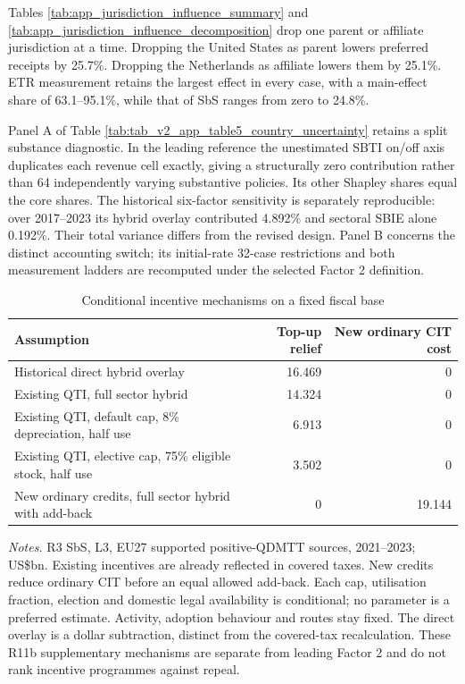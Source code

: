 \documentclass[11pt,a4paper]{article}
\begin{document}



Tables \ref{tab:app_jurisdiction_influence_summary} and \ref{tab:app_jurisdiction_influence_decomposition} drop one parent or affiliate jurisdiction at a time. Dropping the United States as parent lowers preferred receipts by 25.7\%. Dropping the Netherlands as affiliate lowers them by 25.1\%. ETR measurement retains the largest effect in every case, with a main-effect share of 63.1–95.1\%, while that of SbS ranges from zero to 24.8\%.

Panel A of Table \ref{tab:tab_v2_app_table5_country_uncertainty} retains a split substance diagnostic. In the leading reference the unestimated SBTI on/off axis duplicates each revenue cell exactly, giving a structurally zero contribution rather than 64 independently varying substantive policies. Its other Shapley shares equal the core shares. The historical six-factor sensitivity is separately reproducible: over 2017–2023 its hybrid overlay contributed 4.892\% and sectoral SBIE alone 0.192\%. Their total variance differs from the revised design. Panel B concerns the distinct accounting switch; its initial-rate 32-case restrictions and both measurement ladders are recomputed under the selected Factor 2 definition.



\begin{table}[htbp]
\centering\footnotesize
\caption{Conditional incentive mechanisms on a fixed fiscal base}
\label{tab:app_sbti_conditional}
\begin{tabular}{@{}lrr@{}}
\toprule
Assumption & Top-up relief & New ordinary CIT cost \\
\midrule
Historical direct hybrid overlay & 16.469 & 0 \\
Existing QTI, full sector hybrid & 14.324 & 0 \\
Existing QTI, default cap, 8\% depreciation, half use & 6.913 & 0 \\
Existing QTI, elective cap, 75\% eligible stock, half use & 3.502 & 0 \\
New ordinary credits, full sector hybrid with add-back & 0 & 19.144 \\
\bottomrule
\end{tabular}
\par\smallskip\parbox{\textwidth}{\footnotesize\textit{Notes.} R3 SbS, L3, EU27 supported positive-QDMTT sources, 2021–2023; US\$bn. Existing incentives are already reflected in covered taxes. New credits reduce ordinary CIT before an equal allowed add-back. Each cap, utilisation fraction, election and domestic legal availability is conditional; no parameter is a preferred estimate. Activity, adoption behaviour and routes stay fixed. The direct overlay is a dollar subtraction, distinct from the covered-tax recalculation. These R11b supplementary mechanisms are separate from leading Factor 2 and do not rank incentive programmes against repeal.}
\end{table}
\end{document}
